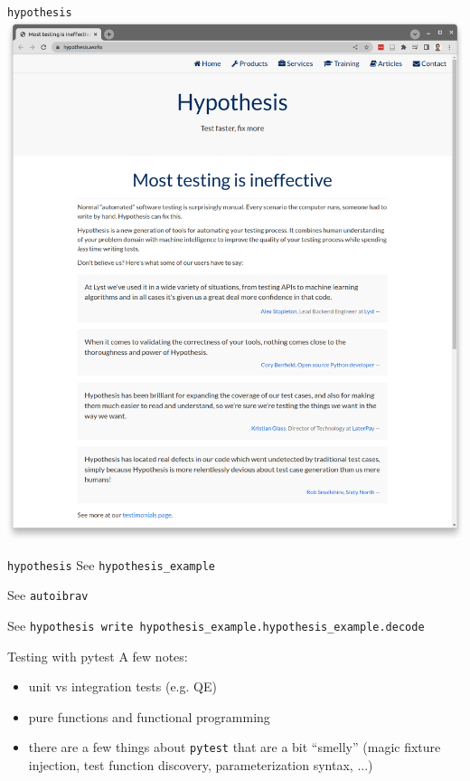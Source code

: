 \documentclass[xcolor=table,aspectratio=169]{beamer}
\numberwithin{equation}{section}
\begin{document}
\begin{frame}{\texttt{hypothesis}}
  \includegraphics[width=\textwidth]{figures/hypothesis.png}
\end{frame}


\begin{frame}{\texttt{hypothesis}}
  See \texttt{hypothesis\_example}

  See \texttt{autoibrav}

  See \texttt{hypothesis write hypothesis\_example.hypothesis\_example.decode}
\end{frame}

\begin{frame}{Testing with pytest}
  A few notes:

  \begin{itemize}
    \item unit vs integration tests (e.g. QE)
    \item pure functions and functional programming
    \item there are a few things about \texttt{pytest} that are a bit ``smelly'' (magic fixture injection, test function discovery, parameterization syntax, ...)
  \end{itemize}


\end{frame}
\end{document}
